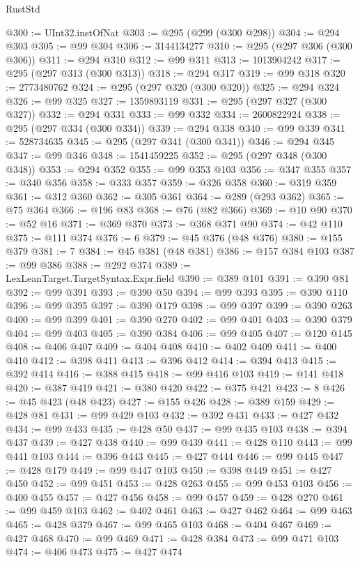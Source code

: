 \begin{lexlean}{RustStd}
\begin{coremodule}
@300 := UInt32.instOfNat
@303 := @295 (@299 (@300 @298))
@304 := @294 @303
@305 := @99 @304
@306 := 3144134277
@310 := @295 (@297 @306 (@300 @306))
@311 := @294 @310
@312 := @99 @311
@313 := 1013904242
@317 := @295 (@297 @313 (@300 @313))
@318 := @294 @317
@319 := @99 @318
@320 := 2773480762
@324 := @295 (@297 @320 (@300 @320))
@325 := @294 @324
@326 := @99 @325
@327 := 1359893119
@331 := @295 (@297 @327 (@300 @327))
@332 := @294 @331
@333 := @99 @332
@334 := 2600822924
@338 := @295 (@297 @334 (@300 @334))
@339 := @294 @338
@340 := @99 @339
@341 := 528734635
@345 := @295 (@297 @341 (@300 @341))
@346 := @294 @345
@347 := @99 @346
@348 := 1541459225
@352 := @295 (@297 @348 (@300 @348))
@353 := @294 @352
@355 := @99 @353 @103
@356 := @347 @355
@357 := @340 @356
@358 := @333 @357
@359 := @326 @358
@360 := @319 @359
@361 := @312 @360
@362 := @305 @361
@364 := @289 (@293 @362)
@365 := @75 @364
@366 := @196 @83
@368 := @76 (@82 @366)
@369 := @10 @90
@370 := @52 @16
@371 := @369 @370
@373 := @368 @371 @90
@374 := @42 @110
@375 := @111 @374
@376 := 6
@379 := @45 @376 (@48 @376)
@380 := @155 @379
@381 := 7
@384 := @45 @381 (@48 @381)
@386 := @157 @384 @103
@387 := @99 @386
@388 := @292 @374
@389 := LexLeanTarget.TargetSyntax.Expr.field
@390 := @389 @101
@391 := @390 @81
@392 := @99 @391
@393 := @390 @50
@394 := @99 @393
@395 := @390 @110
@396 := @99 @395
@397 := @390 @179
@398 := @99 @397
@399 := @390 @263
@400 := @99 @399
@401 := @390 @270
@402 := @99 @401
@403 := @390 @379
@404 := @99 @403
@405 := @390 @384
@406 := @99 @405
@407 := @120 @145
@408 := @406 @407
@409 := @404 @408
@410 := @402 @409
@411 := @400 @410
@412 := @398 @411
@413 := @396 @412
@414 := @394 @413
@415 := @392 @414
@416 := @388 @415
@418 := @99 @416 @103
@419 := @141 @418
@420 := @387 @419
@421 := @380 @420
@422 := @375 @421
@423 := 8
@426 := @45 @423 (@48 @423)
@427 := @155 @426
@428 := @389 @159
@429 := @428 @81
@431 := @99 @429 @103
@432 := @392 @431
@433 := @427 @432
@434 := @99 @433
@435 := @428 @50
@437 := @99 @435 @103
@438 := @394 @437
@439 := @427 @438
@440 := @99 @439
@441 := @428 @110
@443 := @99 @441 @103
@444 := @396 @443
@445 := @427 @444
@446 := @99 @445
@447 := @428 @179
@449 := @99 @447 @103
@450 := @398 @449
@451 := @427 @450
@452 := @99 @451
@453 := @428 @263
@455 := @99 @453 @103
@456 := @400 @455
@457 := @427 @456
@458 := @99 @457
@459 := @428 @270
@461 := @99 @459 @103
@462 := @402 @461
@463 := @427 @462
@464 := @99 @463
@465 := @428 @379
@467 := @99 @465 @103
@468 := @404 @467
@469 := @427 @468
@470 := @99 @469
@471 := @428 @384
@473 := @99 @471 @103
@474 := @406 @473
@475 := @427 @474

\end{coremodule}
\end{lexlean}
